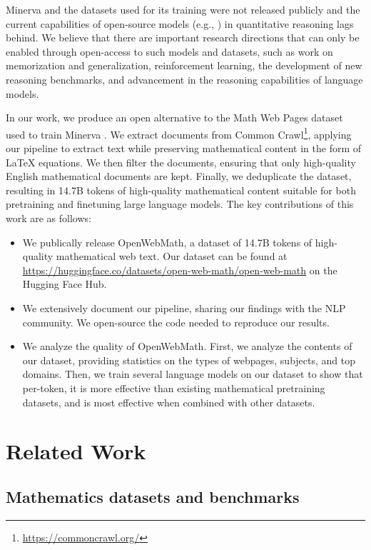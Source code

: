 Minerva and the datasets used for its training were not released publicly and the current capabilities of open-source models (e.g., \citet{touvron2023llama, llama2, codellama, openlm2023openllama, pythia}) in quantitative reasoning lags behind. We believe that there are important research directions that can only be enabled through open-access to such models and datasets, such as work on memorization and generalization, reinforcement learning, the development of new reasoning benchmarks, and advancement in the reasoning capabilities of language models.

In our work, we produce an open alternative to the Math Web Pages dataset used to train Minerva \citep{lewkowycz2022solving}. We extract documents from Common Crawl\footnote{\url{https://commoncrawl.org/}}, applying our pipeline to extract text while preserving mathematical content in the form of \LaTeX{} equations. We then filter the documents, ensuring that only high-quality English mathematical documents are kept. Finally, we deduplicate the dataset, resulting in 14.7B tokens of high-quality mathematical content suitable for both pretraining and finetuning large language models. The key contributions of this work are as follows:

\begin{itemize}
    \item We publically release OpenWebMath, a dataset of 14.7B tokens of high-quality mathematical web text. Our dataset can be found at \href{https://huggingface.co/datasets/open-web-math/open-web-math}{https://huggingface.co/datasets/open-web-math/open-web-math} on the Hugging Face Hub.
    \item We extensively document our pipeline, sharing our findings with the NLP community. We open-source the code needed to reproduce our results.
    \item We analyze the quality of OpenWebMath. First, we analyze the contents of our dataset, providing statistics on the types of webpages, subjects, and top domains. Then, we train several language models on our dataset to show that per-token, it is more effective than existing mathematical pretraining datasets, and is most effective when combined with other datasets.
\end{itemize}

\section{Related Work}
\subsection{Mathematics datasets and benchmarks} 
